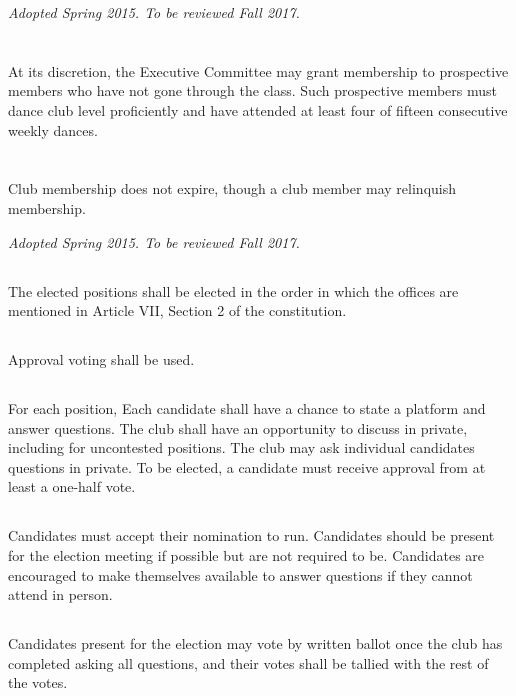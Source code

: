 \documentclass{bylaws}
\newcommand{\sptimes}[2]{\emph{Adopted #1. To be reviewed #2.}}
\begin{document}
\sptimes{Spring 2015}{Fall 2017}

\section{}At its discretion, the Executive Committee may grant membership to prospective members who have not gone through the class. Such prospective members must dance club level proficiently and have attended at least four of fifteen consecutive weekly dances.
\section{}Club membership does not expire, though a club member may relinquish membership.


\label{pol:electappoint}
\sptimes{Spring 2015}{Fall 2017}

\label{pol:elect}

\subsection{}The elected positions shall be elected in the order in which the offices are mentioned in Article VII, Section 2 of the constitution. 
\subsection{}Approval voting shall be used. 
\subsection{}For each position,
\duty Each candidate shall have a chance to state a platform and answer questions.
\duty The club shall have an opportunity to discuss in private, including for uncontested positions.
\duty The club may ask individual candidates questions in private.
\duty To be elected, a candidate must receive approval from at least a one-half vote.  
\subsection{}Candidates must accept their nomination to run. Candidates should be present for the election meeting if possible but are not required to be. Candidates are encouraged to make themselves available to answer questions if they cannot attend in person.
\subsection{}Candidates present for the election may vote by written ballot once the club has completed asking all questions, and their votes shall be tallied with the rest of the votes.
\end{document}

